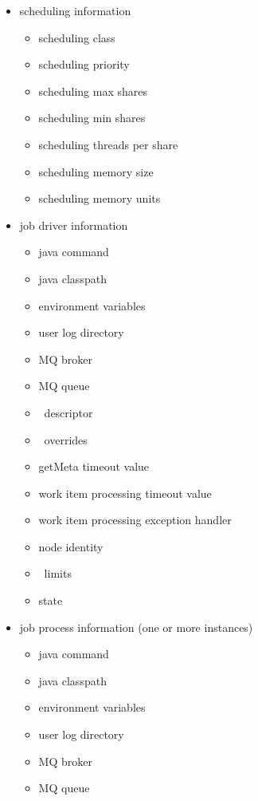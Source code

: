 \begin{itemize}
\begin{itemize}
      \item scheduling information
        \begin{itemize}
          \item scheduling class
          \item scheduling priority
          \item scheduling max shares
          \item scheduling min shares
          \item scheduling threads per share
          \item scheduling memory size
          \item scheduling memory units
        \end{itemize} 
      \item job driver information
        \begin{itemize}
          \item java command
          \item java classpath
          \item environment variables
          \item user log directory
          \item MQ broker
          \item MQ queue
          \item \varCollectionReader~descriptor
          \item \varCollectionReader~overrides
          \item getMeta timeout value
          \item work item processing timeout value
          \item work item processing exception handler
          \item node identity
          \item \varLinuxControlGroup~limits
          \item state
        \end{itemize} 
      \item job process information (one or more instances)
        \begin{itemize}
          \item java command
          \item java classpath
          \item environment variables
          \item user log directory
          \item MQ broker
          \item MQ queue

\end{itemize}
\end{itemize}
\end{itemize}
